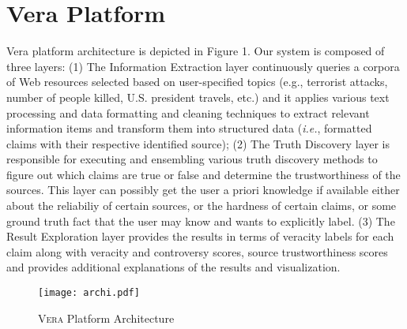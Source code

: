 \section{Vera Platform}

\medskip

Vera platform architecture is depicted in Figure 1. Our system is composed of three layers: 
(1) The Information Extraction layer continuously queries a corpora of Web resources selected based on user-specified topics (e.g., terrorist attacks, number of people killed, U.S. president travels, etc.) and it applies various text processing and data formatting and cleaning techniques to extract relevant information items and transform them into structured data ({\it i.e.}, formatted claims with their respective identified source);
(2) The Truth Discovery layer is responsible for executing and ensembling various truth discovery methods to figure out which claims are true or false  and determine the trustworthiness of the sources. This layer  can possibly get the user a priori knowledge if available either about the reliabiliy of certain sources, or the hardness of certain claims, or some ground truth fact that the user may know and wants to explicitly label.
(3) The Result Exploration layer provides the results in terms of veracity labels for each claim along with veracity and controversy scores, source trustworthiness scores and provides additional explanations of the results and visualization.

\begin{figure*}[!ht]
 \begin{center}
  \texttt{[image: archi.pdf]}
   \end{center}
\label{archi}\caption{{\scshape Vera} Platform Architecture }
\end{figure*}


